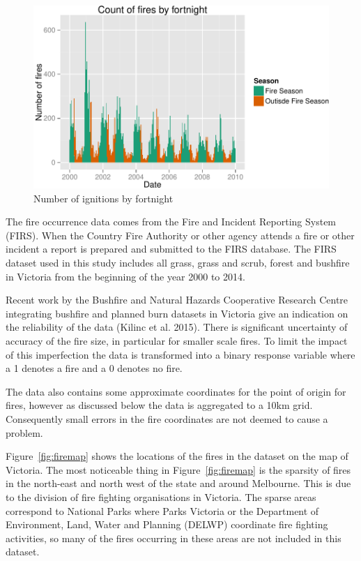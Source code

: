 \documentclass[11pt,a4paper]{article}
\begin{document}
\begin{figure}
  \centering
  \includegraphics[width=.8\textwidth]{figures/occurence.pdf}
  \caption{Number of ignitions by fortnight}
  \label{fig:occ}
\end{figure}

The fire occurrence data comes from the Fire and Incident Reporting System (FIRS). When the Country Fire Authority or other agency attends a fire or other incident a report is prepared and submitted to the FIRS database. The FIRS dataset used in this study includes all grass, grass and scrub, forest and bushfire in Victoria from the beginning of the year 2000 to 2014.

Recent work by the Bushfire and Natural Hazards Cooperative Research Centre integrating bushfire and planned burn datasets in Victoria give an indication on the reliability of the data (Kilinc et al. 2015).  There is significant uncertainty of accuracy of the fire size, in particular for smaller scale fires. To limit the impact of this imperfection the data is transformed into a binary response variable where a 1 denotes a fire and a 0 denotes no fire.

The data also contains some approximate coordinates for the point of origin for fires, however as discussed below the data is aggregated to a 10km grid. Consequently small errors in the fire coordinates are not deemed to cause a problem.

Figure~\ref{fig:firemap} shows the locations of the fires in the dataset on the map of Victoria. The most noticeable thing in Figure~\ref{fig:firemap} is the sparsity of fires in the north-east and north west of the state and around Melbourne. This is due to the division of fire fighting organisations in Victoria. The sparse areas correspond to National Parks where Parks Victoria or the Department of Environment, Land, Water and Planning (DELWP) coordinate fire fighting activities, so many of the fires occurring in these areas are not included in this dataset.
\end{document}
